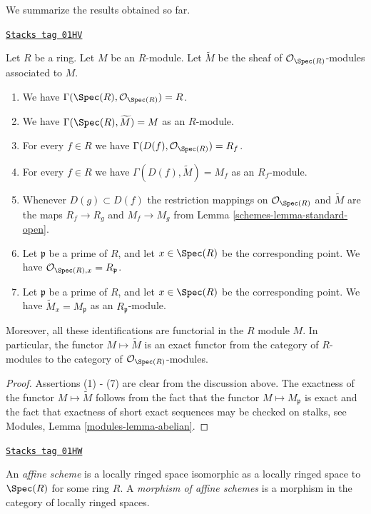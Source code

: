 We summarize the results obtained so far.

\begin{lemma}
\label{schemes-lemma-spec-sheaves}
\href{https://stacks.math.columbia.edu/tag/01HV}{\texttt{Stacks tag 01HV}}

Let $R$ be a ring. Let $M$ be an $R$-module. Let $\widetilde M$
be the sheaf of $\mathcal{O}_{\Spec(R)}$-modules
associated to $M$.
\begin{enumerate}
\item We have $\Gamma(\Spec(R), \mathcal{O}_{\Spec(R)}) = R$.
\item We have $\Gamma(\Spec(R), \widetilde M) = M$ as an $R$-module.
\item For every $f \in R$ we have
$\Gamma(D(f), \mathcal{O}_{\Spec(R)}) = R_f$.
\item For every $f\in R$ we have $\Gamma(D(f), \widetilde M) = M_f$
as an $R_f$-module.
\item Whenever $D(g) \subset D(f)$ the restriction mappings
on $\mathcal{O}_{\Spec(R)}$ and $\widetilde M$
are the maps
$R_f \to R_g$ and $M_f \to M_g$ from Lemma
\ref{schemes-lemma-standard-open}.
\item Let $\mathfrak p$ be a prime of $R$, and let $x \in \Spec(R)$
be the corresponding point. We have
$\mathcal{O}_{\Spec(R), x} = R_{\mathfrak p}$.
\item Let $\mathfrak p$ be a prime of $R$, and let $x \in \Spec(R)$
be the corresponding point. We have $\widetilde M_x = M_{\mathfrak p}$
as an $R_{\mathfrak p}$-module.
\end{enumerate}
Moreover, all these identifications are functorial in the $R$
module $M$. In particular, the functor $M \mapsto \widetilde M$
is an exact functor from the category of $R$-modules
to the category of $\mathcal{O}_{\Spec(R)}$-modules.
\end{lemma}

\begin{proof}
Assertions (1) - (7) are clear from the discussion above.
The exactness of the functor $M \mapsto \widetilde M$
follows from the fact that the functor $M \mapsto M_{\mathfrak p}$
is exact and the fact that exactness of short exact sequences
may be checked on stalks, see
Modules, Lemma \ref{modules-lemma-abelian}.
\end{proof}

\begin{definition}
\label{schemes-definition-affine-scheme}
\href{https://stacks.math.columbia.edu/tag/01HW}{\texttt{Stacks tag 01HW}}

An {\it affine scheme} is a locally ringed space isomorphic
as a locally ringed space to $\Spec(R)$ for some ring $R$.
A {\it morphism of affine schemes} is a morphism in the category
of locally ringed spaces.
\end{definition}

